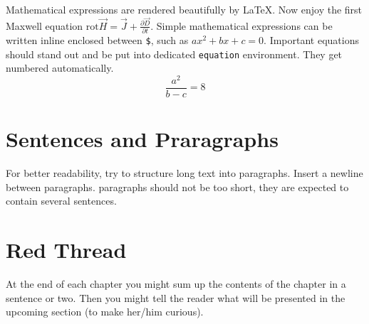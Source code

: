 Mathematical expressions are rendered beautifully by \LaTeX. Now enjoy
the first Maxwell equation
\begin{math}
  \text{rot} \vec{H} = \vec{J} + \frac{\partial \vec{D}}{\partial t}
\end{math}.
%
Simple mathematical expressions can be written inline enclosed between
\verb+$+, such as $ax^2+bx+c = 0$. Important equations should stand out and
be put into dedicated \verb+equation+ environment. They get numbered
automatically.
\begin{equation}
  \frac{a^2}{b - c} = 8
\end{equation}


\section{Sentences and Praragraphs}

For better readability, try to structure long text into paragraphs. Insert
a newline between paragraphs. paragraphs should not be too short, they are
expected to contain several sentences.

\section{Red Thread} %

At the end of each chapter you might sum up the contents of the chapter in
a sentence or two. Then you might tell the reader what will be presented in
the upcoming section (to make her/him curious).



\vfill
\chapterend
